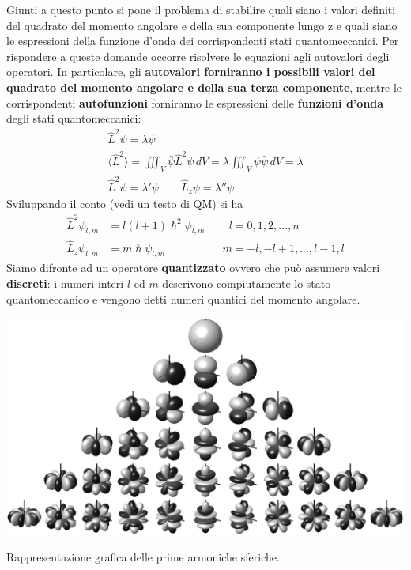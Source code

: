 Giunti a questo punto si pone il problema di stabilire quali siano i
valori definiti del quadrato del momento angolare e della sua componente
lungo z e quali siano le espressioni della funzione d'onda dei
corrispondenti stati quantomeccanici.
Per rispondere a queste domande
occorre risolvere le equazioni agli autovalori degli operatori.
In
particolare, gli \textbf{autovalori forniranno i possibili valori del
quadrato del momento angolare e della sua terza componente}, mentre le
corrispondenti \textbf{autofunzioni} forniranno le espressioni delle
\textbf{funzioni d'onda} degli stati quantomeccanici: \begin{gather*}
                                                          \hat{L}^{2}\psi = \lambda \psi\\
                                                          \langle \hat{L}^{2}\rangle = \iiint_{V} \bar{\psi} \hat{L}^{2}\psi \, dV = \lambda \iiint_{V} \psi \bar{\psi} \, dV = \lambda\\
                                                          \hat{L}^{2} \psi = \lambda' \psi \qquad  \hat{L}_{z} \psi = \lambda'' \psi
\end{gather*}
Sviluppando il conto (vedi un testo di QM) si ha
\begin{align*}
    \hat{L}^{2}\psi_{l,m} &= l(l+1) \hslash^{2} \psi_{l,m} \qquad  \, l = 0,1,2, \dots , n\\
    \hat{L}_{z} \psi_{l,m} &= m \hslash \psi_{l,m} \qquad  \qquad \quad \, m = -l,-l + 1, \dots ,l-1, l
\end{align*} Siamo difronte ad un operatore \textbf{quantizzato} ovvero che può
assumere valori \textbf{discreti}: i numeri interi $l$ ed $m$ descrivono
compiutamente lo stato quantomeccanico e vengono detti numeri quantici
del momento angolare.\\
\begin{marginfigure}
    \includegraphics{figs/spherical-harmonics}
    \caption{Rappresentazione grafica delle prime armoniche sferiche.}
    \label{fig:spherical-harmonics}
\end{marginfigure}
